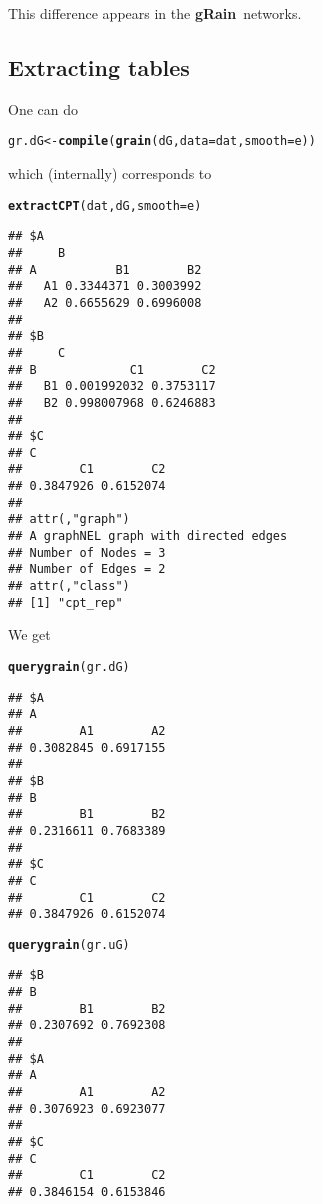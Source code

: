 \documentclass[10pt]{article}\usepackage[]{graphicx}\usepackage[]{color}
\makeatletter
\newcommand{\hlstd}[1]{\textcolor[rgb]{0.345,0.345,0.345}{#1}}%
\newcommand{\hlkwb}[1]{\textcolor[rgb]{0.69,0.353,0.396}{#1}}%
\newcommand{\hlkwc}[1]{\textcolor[rgb]{0.333,0.667,0.333}{#1}}%
\newcommand{\hlkwd}[1]{\textcolor[rgb]{0.737,0.353,0.396}{\textbf{#1}}}%
\newenvironment{kframe}{%
 \def\at@end@of@kframe{}%
 \ifinner\ifhmode%
  \def\at@end@of@kframe{\end{minipage}}%
  \begin{minipage}{\columnwidth}%
 \fi\fi%
 \def\FrameCommand##1{\hskip\@totalleftmargin \hskip-\fboxsep
 \colorbox{shadecolor}{##1}\hskip-\fboxsep
     \hskip-\linewidth \hskip-\@totalleftmargin \hskip\columnwidth}%
 \MakeFramed {\advance\hsize-\width
   \@totalleftmargin\z@ \linewidth\hsize
   \@setminipage}}%
 {\par\unskip\endMakeFramed%
 \at@end@of@kframe}
\newenvironment{knitrout}{}{} %
\def\grbn{{\bf gRain}}
\makeatother
\begin{document}
This difference appears in the \grbn\ networks.

\subsection{Extracting tables}
\label{sec:extracting-tables}

One can do
\begin{knitrout}
\color{fgcolor}\begin{kframe}
\begin{alltt}
\hlstd{gr.dG} \hlkwb{<-} \hlkwd{compile}\hlstd{(}\hlkwd{grain}\hlstd{(dG,} \hlkwc{data}\hlstd{=dat,} \hlkwc{smooth}\hlstd{=e))}
\end{alltt}
\end{kframe}
\end{knitrout}

which (internally) corresponds to
\begin{knitrout}
\color{fgcolor}\begin{kframe}
\begin{alltt}
\hlkwd{extractCPT}\hlstd{(dat, dG,} \hlkwc{smooth}\hlstd{=e)}
\end{alltt}
\begin{verbatim}
## $A
##     B
## A           B1        B2
##   A1 0.3344371 0.3003992
##   A2 0.6655629 0.6996008
## 
## $B
##     C
## B             C1        C2
##   B1 0.001992032 0.3753117
##   B2 0.998007968 0.6246883
## 
## $C
## C
##        C1        C2 
## 0.3847926 0.6152074 
## 
## attr(,"graph")
## A graphNEL graph with directed edges
## Number of Nodes = 3 
## Number of Edges = 2 
## attr(,"class")
## [1] "cpt_rep"
\end{verbatim}
\end{kframe}
\end{knitrout}

We get
\begin{knitrout}
\color{fgcolor}\begin{kframe}
\begin{alltt}
\hlkwd{querygrain}\hlstd{(gr.dG)}
\end{alltt}
\begin{verbatim}
## $A
## A
##        A1        A2 
## 0.3082845 0.6917155 
## 
## $B
## B
##        B1        B2 
## 0.2316611 0.7683389 
## 
## $C
## C
##        C1        C2 
## 0.3847926 0.6152074
\end{verbatim}
\begin{alltt}
\hlkwd{querygrain}\hlstd{(gr.uG)}
\end{alltt}
\begin{verbatim}
## $B
## B
##        B1        B2 
## 0.2307692 0.7692308 
## 
## $A
## A
##        A1        A2 
## 0.3076923 0.6923077 
## 
## $C
## C
##        C1        C2 
## 0.3846154 0.6153846
\end{verbatim}
\end{kframe}
\end{knitrout}
\end{document}
